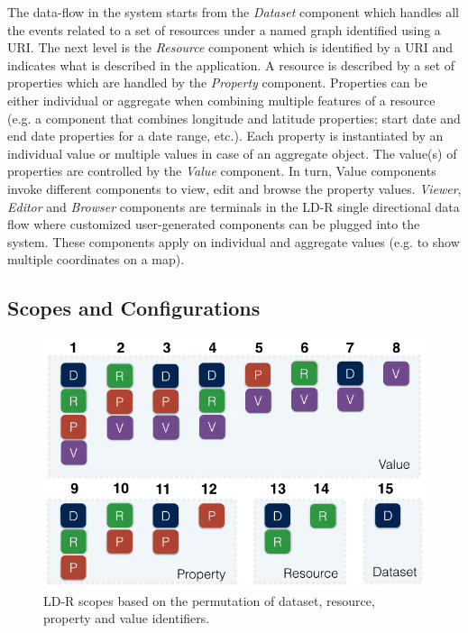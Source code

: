 \documentclass{acm_proc_article-sp}
\begin{document}
The data-flow in the system starts from the \emph{Dataset} component which handles all the events related to a set of resources under a named graph identified using a URI.
The next level is the \emph{Resource} component which is identified by a URI and indicates what is described in the application.
A resource is described by a set of properties which are handled by the \emph{Property} component. 
Properties can be either individual or aggregate when combining multiple features of a resource (e.g. a component that combines longitude and latitude properties; start date and end date properties for a date range, etc.).
Each property is instantiated by an individual value or multiple values in case of an aggregate object. 
The value(s) of properties are controlled by the \emph{Value} component.
In turn, Value components invoke different components to view, edit and browse the property values.
\emph{Viewer}, \emph{Editor} and \emph{Browser} components are terminals in the LD-R single directional data flow where customized user-generated components can be plugged into the system.
These components apply on individual and aggregate values (e.g. to show multiple coordinates on a map).

\subsection{Scopes and Configurations}

\begin{figure}[tb]
  \includegraphics[width=.9\linewidth]{images/scopes.jpg}
  \caption{LD-R scopes based on the permutation of dataset, resource, property and value identifiers.}
  \label{fig:scopes}
\end{figure}
\end{document}

